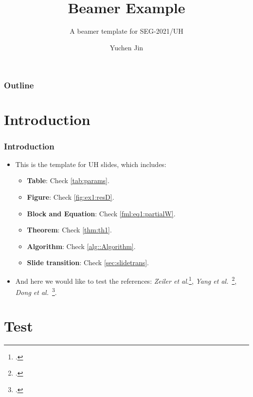 \documentclass[aspectratio=169,hyperref={implicit=true}]{beamer}
\title[Demo]{Beamer Example}
\author{Yuchen Jin}
\subtitle{A beamer template for SEG-2021/UH}
\date{\DTMdate{2022-09-02}}
\institute[Department of ECE]{University of Houston\\Department of ECE}
\begin{document}
\titleframe

\begin{frame}

\frametitle{Outline}
\tableofcontents[currentsection]

\end{frame}

\section{Introduction}

\begin{frame}
  
\frametitle{Introduction}

\begin{itemize}
  \item This is the template for UH slides, which includes:
  \begin{itemize}
    \item \textbf{Table}: Check \cref{tab:params}.
    \item \textbf{Figure}: Check \cref{fig:ex1:resD}.
    \item \textbf{Block and Equation}: Check \eqref{fml:eq1:partialW}.
    \item \textbf{Theorem}: Check \cref{thm:th1}.
    \item \textbf{Algorithm}: Check \cref{alg::Algorithm}.
    \item \textbf{Slide transition}: Check \cref{sec:slidetrans}.
  \end{itemize}
  \item And here we would like to test the references: \textit{Zeiler et al.}\footcite{Zeiler5539957}, \textit{Yang et al.}~\footcite{Yang6175956}, \textit{Dong et al.}~\footcite{Dong7115171}.
\end{itemize}

\end{frame}

\section{Test}
\end{document}
